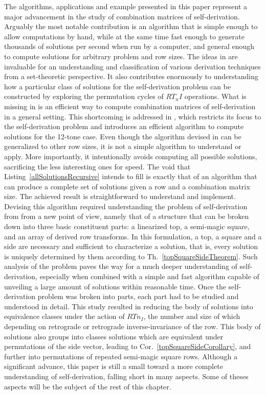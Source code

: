 The algorithms, applications and example presented in this paper represent a major advancement in the study of combination matrices of self-derivation. Arguably the most notable contribution is an algorithm that is simple enough to allow computations by hand, while at the same time fast enough to generate thousands of solutions per second when run by a computer, and general enough to compute solutions for arbitrary problem and row sizes. The ideas in \cite{Starr1984} are invaluable for an understanding and classification of various derivation techniques from a set-theoretic perspective. It also contributes enormously to understanding how a particular class of solutions for the self-derivation problem can be constructed by exploring the permutation cycles of $RT_nI$ operations. What is missing in \cite{Starr1984} is an efficient way to compute combination matrices of self-derivation in a general setting. This shortcoming is addressed in \cite{Kowalski1987b}, which restricts its focus to the self-derivation problem and introduces an efficient algorithm to compute solutions for the 12-tone case. Even though the algorithm devised in \cite{Kowalski1987b} can be generalized to other row sizes, it is not a simple algorithm to understand or apply. More importantly, it intentionally avoids computing all possible solutions, sacrificing the less interesting ones for speed. The void that Listing~\ref{allSolutionsRecursive} intends to fill is exactly that of an algorithm that can produce a complete set of solutions given a row and a combination matrix size. The achieved result is straightforward to understand and implement. Devising this algorithm required understanding the problem of self-derivation from from a new point of view, namely that of a structure that can be broken down into three basic constituent parts: a linearized top, a semi-magic square, and an array of derived row transforms. In this formulation, a top, a square and a side are necessary and sufficient to characterize a solution, that is, every solution is uniquely determined by them according to Th.~\ref{topSquareSideTheorem}. Such analysis of the problem paves the way for a much deeper understanding of self-derivation, especially when combined with a simple and fast algorithm capable of unveiling a large amount of solutions within reasonable time. Once the self-derivation problem was broken into parts, each part had to be studied and understood in detail. This study resulted in reducing the body of solutions into equivalence classes under the action of $RTn_I$, the number and size of which depending on retrograde or retrograde inverse-invariance of the row. This body of solutions also groups into classes solutions which are equivalent under permutations of the side vector, leading to Cor.~\ref{topSquareSideCorollary}, and further into permutations of repeated semi-magic square rows. Although a significant advance, this paper is still a small toward a more complete understanding of self-derivation, falling short in many aspects. Some of theses aspects will be the subject of the rest of this chapter.

